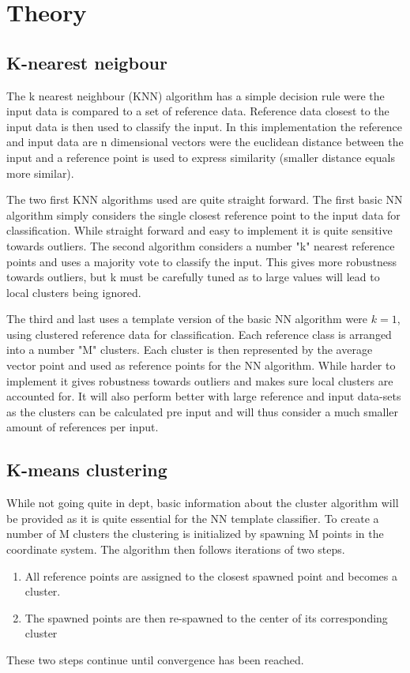 \documentclass{article}
\begin{document}
\section{Theory}
\subsection{K-nearest neigbour}
The k nearest neighbour (KNN) algorithm has a simple decision rule were the input data is compared to a set of reference data. Reference data closest to the input data is then used to classify the input. \cite{Compendium in classification for TTT4275} In this implementation the reference and input data are n dimensional vectors were the euclidean distance between the input and a reference point is used to express similarity (smaller distance equals more similar). 

The two first KNN algorithms used are quite straight forward. The first basic NN algorithm simply considers the single closest reference point to the input data for classification. While straight forward and easy to implement it is quite sensitive towards outliers.  
The second algorithm considers a number "k" nearest reference points and uses a majority vote to classify the input. This gives more robustness towards outliers, but k must be carefully tuned as to large values will lead to local clusters being ignored. 

The third and last uses a template version of the basic NN algorithm were $k = 1$, using clustered reference data for classification. Each reference class is arranged into a number "M" clusters. Each cluster is then represented by the average vector point and used as reference points for the NN algorithm. While harder to implement it gives robustness towards outliers and makes sure local clusters are accounted for. It will also perform better with large reference and input data-sets as the clusters can be calculated pre input and will thus consider a much smaller amount of references per input.

\subsection{K-means clustering}
While not going quite in dept, basic information about the cluster algorithm will be provided as it is quite essential for the NN template classifier. To create a number of M clusters the clustering is initialized by spawning M points in the coordinate system. The algorithm then follows iterations of two steps.
\begin{enumerate}

    \item All reference points are assigned to the closest spawned point and becomes a cluster. 
    \item The spawned points are then re-spawned to the center of its corresponding cluster
\end{enumerate}
These two steps continue until convergence has been reached.   
\end{document}
